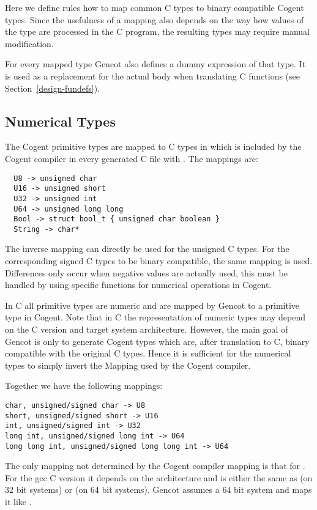 
Here we define rules how to map common C types to binary compatible Cogent types. Since the usefulness of a mapping
also depends on the way how values of the type are processed in the C program, the resulting types may require manual 
modification.

For every mapped type Gencot also defines a dummy expression of that type. It is used as a replacement for the actual 
body when translating C functions (see Section~\ref{design-fundefs}).

\subsection{Numerical Types}
\label{design-types-prim}

The Cogent primitive types are mapped to C types in  which is included by the Cogent compiler
in every generated C file with . The mappings are: 
\begin{verbatim}
  U8 -> unsigned char
  U16 -> unsigned short 
  U32 -> unsigned int
  U64 -> unsigned long long
  Bool -> struct bool_t { unsigned char boolean }
  String -> char*
\end{verbatim}
The inverse mapping can directly be used for the unsigned C types. For the corresponding signed C types to be binary
compatible, the same mapping is used. Differences only occur when negative values are actually used, this must be handled by using specific functions for numerical operations in Cogent.

In C all primitive types are numeric and are mapped by Gencot to a primitive type in Cogent. Note that in C the representation 
of numeric types may depend on the C version and target system architecture. However, the main goal of Gencot is only to generate
Cogent types which are, after translation to C, binary compatible with the original C types. Hence it is sufficient for the numerical 
types to simply invert the Mapping used by the Cogent compiler.

Together we have the following mappings:
\begin{verbatim}
char, unsigned/signed char -> U8
short, unsigned/signed short -> U16
int, unsigned/signed int -> U32
long int, unsigned/signed long int -> U64
long long int, unsigned/signed long long int -> U64
\end{verbatim}

The only mapping not determined by the Cogent compiler mapping is that for . For the gcc C version 
it depends on the architecture and is either the same as  (on 32 bit systems) or 
(on 64 bit systems). Gencot assumes a 64 bit system and maps it like .

